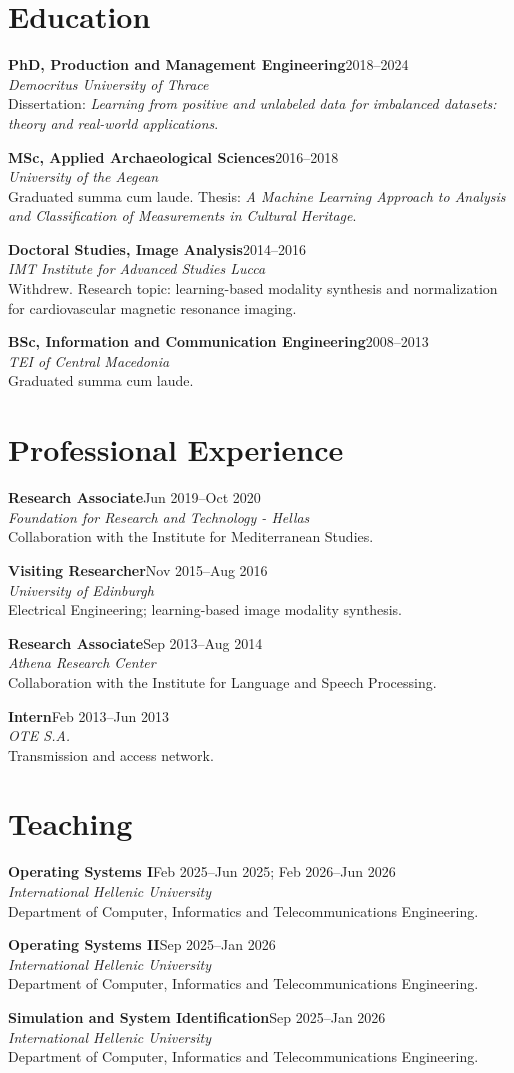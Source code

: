 \documentclass[11pt,a4paper]{article}
\newcommand{\cvsection}[1]{\section*{#1}}
\newcommand{\role}[4]{%
  \textbf{#2}\hfill{\color{muted}#1}\\
  \textit{#3}\\
  #4\par\vspace{3pt}
}
\newcommand{\degree}[4]{%
  \textbf{#2}\hfill{\color{muted}#1}\\
  \textit{#3}\\
  #4\par\vspace{3pt}
}
\begin{document}
\cvsection{Education}
\degree{2018--2024}{PhD, Production and Management Engineering}{Democritus University of Thrace}{Dissertation: \textit{Learning from positive and unlabeled data for imbalanced datasets: theory and real-world applications}.}
\degree{2016--2018}{MSc, Applied Archaeological Sciences}{University of the Aegean}{Graduated summa cum laude. Thesis: \textit{A Machine Learning Approach to Analysis and Classification of Measurements in Cultural Heritage}.}
\degree{2014--2016}{Doctoral Studies, Image Analysis}{IMT Institute for Advanced Studies Lucca}{Withdrew. Research topic: learning-based modality synthesis and normalization for cardiovascular magnetic resonance imaging.}
\degree{2008--2013}{BSc, Information and Communication Engineering}{TEI of Central Macedonia}{Graduated summa cum laude.}

\cvsection{Professional Experience}
\role{Jun 2019--Oct 2020}{Research Associate}{Foundation for Research and Technology - Hellas}{Collaboration with the Institute for Mediterranean Studies.}
\role{Nov 2015--Aug 2016}{Visiting Researcher}{University of Edinburgh}{Electrical Engineering; learning-based image modality synthesis.}
\role{Sep 2013--Aug 2014}{Research Associate}{Athena Research Center}{Collaboration with the Institute for Language and Speech Processing.}
\role{Feb 2013--Jun 2013}{Intern}{OTE S.A.}{Transmission and access network.}

\cvsection{Teaching}
\role{Feb 2025--Jun 2025; Feb 2026--Jun 2026}{Operating Systems I}{International Hellenic University}{Department of Computer, Informatics and Telecommunications Engineering.}
\role{Sep 2025--Jan 2026}{Operating Systems II}{International Hellenic University}{Department of Computer, Informatics and Telecommunications Engineering.}
\role{Sep 2025--Jan 2026}{Simulation and System Identification}{International Hellenic University}{Department of Computer, Informatics and Telecommunications Engineering.}
\end{document}
